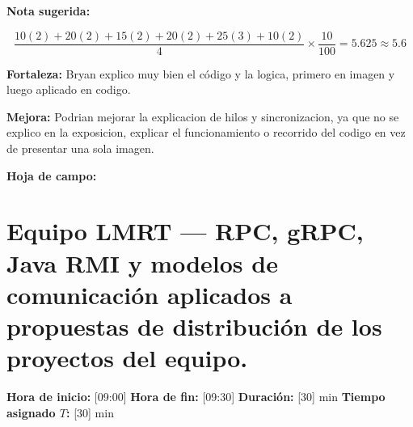 \documentclass[11pt,a4paper]{article}
\begin{document}
\textbf{Nota sugerida:}

\[
    \frac{
        10(2)+20(2)+15(2)+20(2)+25(3)+10(2)
    }{4}
    \times \frac{10}{100}
    = 5.625 \approx 5.6
\]

\textbf{Fortaleza:} Bryan explico muy bien el código y la logica, primero en imagen y luego aplicado en codigo.

\textbf{Mejora:} Podrian mejorar la explicacion de hilos y sincronizacion, ya que no se explico en la exposicion, explicar el funcionamiento o recorrido del codigo en vez de presentar una sola imagen.

\textbf{Hoja de campo:}

\clearpage


\section{Equipo LMRT --- RPC, gRPC, Java RMI y modelos de comunicación aplicados a propuestas de distribución de los proyectos del equipo.}

\textbf{Hora de inicio:} [09:00] \quad
\textbf{Hora de fin:} [09:30] \quad
\textbf{Duración:} [30] min \quad
\textbf{Tiempo asignado $T$:} [30] min
\end{document}
